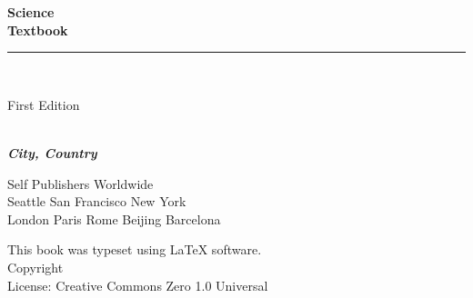 \documentclass{book}
\makeatletter
\newcommand{\booksubtitle}{A Latex Template for a Science Textbook}
\newcommand{\booklicense}{Creative Commons Zero 1.0 Universal}
\newcommand{\authorsubtitle}{City, Country}
\newcommand{\bookauthor}{\@author}
\makeatother
\begin{document}
\begin{titlepage}
\begin{flushleft}

\textbf{\fontsize{48}{54}\selectfont Science\\Textbook\\}

\par\noindent\rule{\textwidth}{4pt}\\


\begin{flushright}
\Large First Edition
\end{flushright}

\vspace{\fill}

\textbf{\large \bookauthor}\\[3.5pt]
\textbf{\large \textit{\authorsubtitle}}

\vspace{\fill}

\begin{center}
\small{Self Publishers Worldwide\\
Seattle San Francisco New York\\
London Paris Rome Beijing Barcelona}
\end{center}

\end{flushleft}
\end{titlepage}
\restoregeometry

\thispagestyle{empty}

\begin{flushleft}
\vspace*{\fill}
This book was typeset using \LaTeX{} software.\\
\vspace{\fill}
Copyright \textcopyright{} \the\year{}  \bookauthor\\
License: \booklicense
\end{flushleft}
\end{document}
